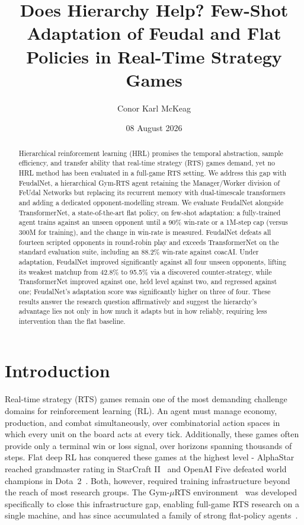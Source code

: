 \documentclass[sigconf,review=false]{acmart}
\title{Does Hierarchy Help? Few-Shot Adaptation of Feudal and Flat Policies in Real-Time Strategy Games}
\author{Conor Karl McKeag}
\affiliation{
  \institution{University of Cape Town}
  \city{Cape Town}
  \country{South Africa}
}
\date{08 August 2026}
\begin{document}
\begin{abstract}
Hierarchical reinforcement learning (HRL) promises the temporal
abstraction, sample efficiency, and transfer ability that real-time
strategy (RTS) games demand, yet no HRL method has been evaluated in
a full-game RTS setting. We address this gap with FeudalNet, a
hierarchical Gym-\textmu RTS agent retaining the Manager/Worker
division of FeUdal Networks but replacing its recurrent memory with
dual-timescale transformers and adding a dedicated
opponent-modelling stream. We evaluate FeudalNet alongside
TransformerNet, a state-of-the-art flat policy, on few-shot
adaptation: a fully-trained agent trains against an unseen opponent
until a 90\% win-rate or a 1M-step cap (versus 300M for training),
and the change in win-rate is measured. FeudalNet defeats all
fourteen scripted opponents in round-robin play and exceeds
TransformerNet on the standard evaluation suite, including an
88.2\% win-rate against coacAI. Under adaptation, FeudalNet improved
significantly against all four unseen opponents, lifting its weakest
matchup from 42.8\% to 95.5\% via a discovered counter-strategy,
while TransformerNet improved against one, held level against two,
and regressed against one; FeudalNet's adaptation score was
significantly higher on three of four. These results answer the
research question affirmatively and suggest the hierarchy's
advantage lies not only in how much it adapts but in how reliably,
requiring less intervention than the flat baseline.
\end{abstract}

\maketitle

\section{Introduction}
Real-time strategy (RTS) games remain one of the most demanding challenge domains for reinforcement learning (RL). An agent must manage economy, production, and combat simultaneously, over combinatorial action spaces in which every unit on the board acts at every tick. Additionally, these games often provide only a terminal win or loss signal, over horizons spanning thousands of steps. 
Flat deep RL has conquered these games at the highest level - AlphaStar reached grandmaster rating in StarCraft II~\cite{alphastar} and OpenAI Five defeated world champions in Dota~2~\cite{dota2five}. 
Both, however, required training infrastructure beyond the reach of most research groups. 
The Gym-$\mu$RTS environment~\cite{micrortsgridnet} was developed specifically to close this infrastructure gap, enabling full-game RTS research on a single machine, and has since accumulated a family of strong flat-policy agents~\cite{micrortsgridnet, transformernet}.
\end{document}
